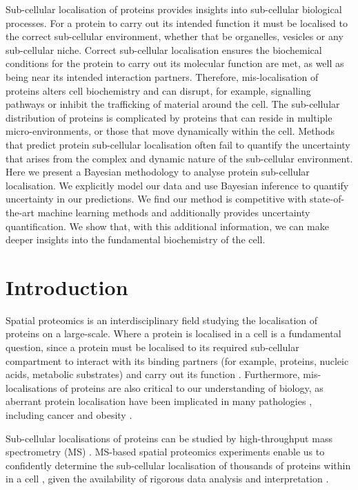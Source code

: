 \documentclass[10pt,letterpaper]{article}\usepackage[]{graphicx}\usepackage[]{color}
\begin{document}
Sub-cellular localisation of proteins provides insights into
sub-cellular biological processes. For a protein to carry out its
intended function it must be localised to the correct sub-cellular
environment, whether that be organelles, vesicles or any sub-cellular
niche. Correct sub-cellular localisation ensures the biochemical
conditions for the protein to carry out its molecular function are
met, as well as being near its intended interaction
partners. Therefore, mis-localisation of proteins alters cell
biochemistry and can disrupt, for example, signalling pathways or
inhibit the trafficking of material around the cell. The sub-cellular
distribution of proteins is complicated by proteins that can reside in
multiple micro-environments, or those that move dynamically within the
cell. Methods that predict protein sub-cellular localisation often
fail to quantify the uncertainty that arises from the complex and
dynamic nature of the sub-cellular environment. Here we present a
Bayesian methodology to analyse protein sub-cellular localisation. We
explicitly model our data and use Bayesian inference to quantify
uncertainty in our predictions. We find our
method is competitive with state-of-the-art machine learning methods
and additionally provides uncertainty quantification. We show that, with this
additional information, we can make deeper insights into the
fundamental biochemistry of the cell.



\section*{Introduction}\label{Intro}

Spatial proteomics is an interdisciplinary field studying the
localisation of proteins on a large-scale. Where a protein is
localised in a cell is a fundamental question, since a protein must be
localised to its required sub-cellular compartment to interact with
its binding partners (for example, proteins, nucleic acids, metabolic
substrates) and carry out its function
\cite{Gibson:2009}. Furthermore, mis-localisations of proteins are
also critical to our understanding of biology, as aberrant protein
localisation have been implicated in many pathologies
\cite{Olkkonen:2006, Luheshi:2008, Laurila:2009, De:2011, Cody:2013},
including cancer \cite{Kau:2004, Rodriguez:2004, Latorre:2005,
  Shin:2013} and obesity \cite{Siljee:2018}.

Sub-cellular localisations of proteins
can be studied by high-throughput mass spectrometry (MS)
\cite{Gatto:2010}. MS-based spatial proteomics experiments enable us
to confidently determine the sub-cellular localisation of thousands of
proteins within in a cell \cite{hyper}, given the availability of
rigorous data analysis and interpretation \cite{Gatto:2010}.
\end{document}
